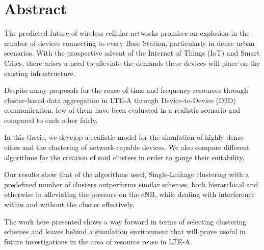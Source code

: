 \thispagestyle{plain}

\section*{Abstract}

The predicted future of wireless cellular networks promises an explosion in the number of devices connecting to every Base Station, particularly in dense urban scenarios. With the prospective advent of the Internet of Things (IoT) and Smart Cities, there arises a need to alleviate the demands these devices will place on the existing infrastructure.

Despite many proposals for the reuse of time and frequency resources through cluster-based data aggregation in LTE-A through Device-to-Device (D2D) communication, few of them have been evaluated in a realistic scenario and compared to each other fairly.

In this thesis, we develop a realistic model for the simulation of highly dense cities and the clustering of network-capable devices. We also compare different algorithms for the creation of said clusters in order to gauge their suitability.

Our results show that of the algorithms used, Single-Linkage clustering with a predefined number of clusters outperforms similar schemes, both hierarchical and otherwise in alleviating the pressure on the eNB, while dealing with interference within and without the cluster effectively.

The work here presented shows a way forward in terms of selecting clustering schemes and leaves behind a simulation environment that will prove useful in future investigations in the area of resource reuse in LTE-A.